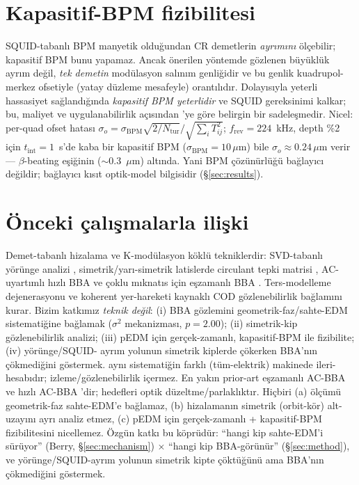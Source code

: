 \documentclass[twocolumn,a4paper,10pt]{article}
\begin{document}
\section{Kapasitif-BPM fizibilitesi}
\label{sec:capacitive}
SQUID-tabanlı BPM manyetik olduğundan CR demetlerin \emph{ayrımını} ölçebilir;
kapasitif BPM bunu yapamaz. Ancak önerilen yöntemde gözlenen büyüklük ayrım değil,
\emph{tek demetin} modülasyon salınım genliğidir ve bu genlik kuadrupol-merkez
ofsetiyle (yatay düzleme mesafeyle) orantılıdır. Dolayısıyla yeterli hassasiyet
sağlandığında \emph{kapasitif BPM yeterlidir} ve SQUID gereksinimi kalkar; bu,
maliyet ve uygulanabilirlik açısından \cite{omarov2022}'ye göre belirgin bir
sadeleşmedir. Nicel: per-quad ofset hatası $\sigma_o = \sigma_\mathrm{BPM}
\sqrt{2/N_\mathrm{tur}}/\sqrt{\sum_i T_{ij}^2}$; $f_\mathrm{rev}=224$~kHz, depth
\%2 için $t_\mathrm{int}=1$~s'de kaba bir kapasitif BPM ($\sigma_\mathrm{BPM}=
10\,\mu$m) bile $\sigma_o\approx0.24\,\mu$m verir --- $\beta$-beating eşiğinin
($\sim$0.3~$\mu$m) altında. Yani BPM çözünürlüğü bağlayıcı değildir; bağlayıcı
kısıt optik-model bilgisidir (§\ref{sec:results}).

\section{Önceki çalışmalarla ilişki}
\label{sec:priorart}
Demet-tabanlı hizalama ve K-modülasyon köklü tekniklerdir: SVD-tabanlı yörünge
analizi \cite{chung1993}, simetrik/yarı-simetrik latislerde circulant tepki
matrisi \cite{mirza2019}, AC-uyartımlı hızlı BBA \cite{fastbba2020} ve
çoklu mıknatıs için eşzamanlı BBA \cite{huang2022}. Ters-modelleme
dejenerasyonu \cite{wegscheider2023} ve koherent yer-hareketi kaynaklı COD
\cite{rossbach1989} gözlenebilirlik bağlamını kurar. Bizim katkımız
\emph{teknik değil}: (i) BBA gözlemini geometrik-faz/sahte-EDM sistematiğine
bağlamak ($\sigma^2$ mekanizması, $p=2.00$); (ii) simetrik-kip gözlenebilirlik analizi;
(iii) pEDM için gerçek-zamanlı, kapasitif-BPM ile fizibilite; (iv) yörünge/SQUID-
ayrım yolunun simetrik kiplerde çökerken BBA'nın çökmediğini göstermek.
\cite{haciomeroglu2017} aynı sistematiğin farklı (tüm-elektrik) makinede
ileri-hesabıdır; izleme/gözlenebilirlik içermez. En yakın prior-art eşzamanlı
AC-BBA \cite{huang2022} ve hızlı AC-BBA \cite{fastbba2020}'dir; hedefleri optik
düzeltme/parlaklıktır. Hiçbiri (a) ölçümü geometrik-faz sahte-EDM'e bağlamaz,
(b) hizalamanın simetrik (orbit-kör) alt-uzayını ayrı analiz etmez, (c) pEDM için
gerçek-zamanlı + kapasitif-BPM fizibilitesini nicellemez. Özgün katkı bu köprüdür:
``hangi kip sahte-EDM'i sürüyor'' (Berry, §\ref{sec:mechanism}) $\times$ ``hangi
kip BBA-görünür'' (§\ref{sec:method}), ve yörünge/SQUID-ayrım yolunun simetrik
kipte çöktüğünü ama BBA'nın çökmediğini göstermek.
\end{document}
